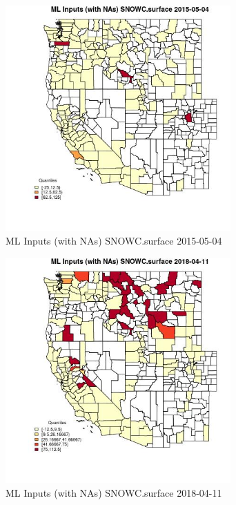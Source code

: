 \begin{figure} 
\centering  
\includegraphics[width=0.77\textwidth]{Code_Outputs/Report_ML_input_PM25_Step4_part_e_de_duplicated_aves_compiled_2019-05-18wNAs_CountySNOWCsurfaceMean2015-05-04_2015-05-04.jpg} 
\caption{\label{fig:Report_ML_input_PM25_Step4_part_e_de_duplicated_aves_compiled_2019-05-18wNAsCountySNOWCsurfaceMean2015-05-04_2015-05-04}ML Inputs (with NAs) SNOWC.surface 2015-05-04} 
\end{figure} 
 

\begin{figure} 
\centering  
\includegraphics[width=0.77\textwidth]{Code_Outputs/Report_ML_input_PM25_Step4_part_e_de_duplicated_aves_compiled_2019-05-18wNAs_CountySNOWCsurfaceMean2018-04-11_2018-04-11.jpg} 
\caption{\label{fig:Report_ML_input_PM25_Step4_part_e_de_duplicated_aves_compiled_2019-05-18wNAsCountySNOWCsurfaceMean2018-04-11_2018-04-11}ML Inputs (with NAs) SNOWC.surface 2018-04-11} 
\end{figure} 
 

